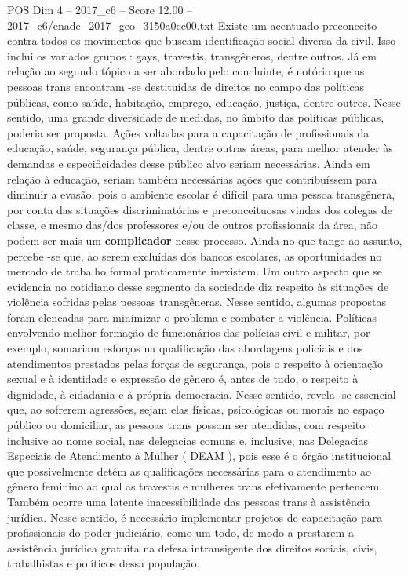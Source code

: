 \begin{textsample}{POS Dim 4 – 2017\_c6 – Score 12.00 – 2017\_c6/enade\_2017\_geo\_3150a0cc00.txt}
Existe um acentuado preconceito contra todos os movimentos que buscam identificação social diversa da civil.
Isso inclui os variados grupos : gays, travestis, transgêneros, dentre outros.
Já em relação ao segundo tópico a ser abordado pelo concluinte, é notório que as pessoas trans encontram -se destituídas de direitos no campo das políticas públicas, como saúde, habitação, emprego, educação, justiça, dentre outros.
Nesse sentido, uma grande diversidade de medidas, no âmbito das políticas públicas, poderia ser proposta.
Ações voltadas para a capacitação de profissionais da educação, saúde, segurança pública, dentre outras áreas, para melhor atender às demandas e especificidades desse público alvo seriam necessárias.
Ainda em relação à educação, seriam também necessárias ações que contribuíssem para diminuir a evasão, pois o ambiente escolar é difícil para uma pessoa transgênera, por conta das situações discriminatórias e preconceituosas vindas dos colegas de classe, e mesmo das/dos professores e/ou de outros profissionais da área, não podem ser mais um \textbf{complicador} nesse processo.
Ainda no que tange ao assunto, percebe -se que, ao serem excluídas dos bancos escolares, as oportunidades no mercado de trabalho formal praticamente inexistem.
Um outro aspecto que se evidencia no cotidiano desse segmento da sociedade diz respeito às situações de violência sofridas pelas pessoas transgêneras.
Nesse sentido, algumas propostas foram elencadas para minimizar o problema e combater a violência.
Políticas envolvendo melhor formação de funcionários das polícias civil e militar, por exemplo, somariam esforços na qualificação das abordagens policiais e dos atendimentos prestados pelas forças de segurança, pois o respeito à orientação sexual e à identidade e expressão de gênero é, antes de tudo, o respeito à dignidade, à cidadania e à própria democracia.
Nesse sentido, revela -se essencial que, ao sofrerem agressões, sejam elas físicas, psicológicas ou morais no espaço público ou domiciliar, as pessoas trans possam ser atendidas, com respeito inclusive ao nome social, nas delegacias comuns e, inclusive, nas Delegacias Especiais de Atendimento à Mulher ( DEAM ), pois esse é o órgão institucional que possivelmente detém as qualificações necessárias para o atendimento ao gênero feminino ao qual as travestis e mulheres trans efetivamente pertencem.
Também ocorre uma latente inacessibilidade das pessoas trans à assistência jurídica.
Nesse sentido, é necessário implementar projetos de capacitação para profissionais do poder judiciário, como um todo, de modo a prestarem a assistência jurídica gratuita na defesa intransigente dos direitos sociais, civis, trabalhistas e políticos dessa população.

\end{textsample}
